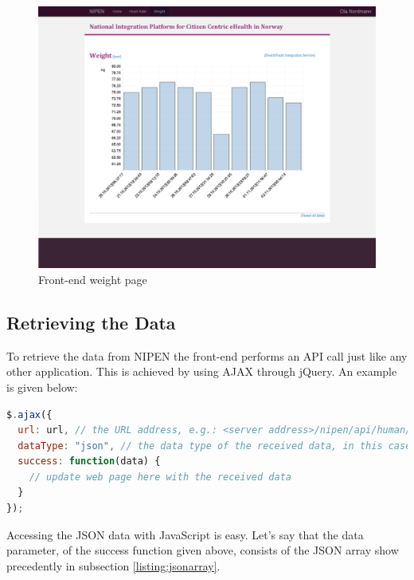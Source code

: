 \begin{figure}[H]
\centering
\includegraphics[scale=0.4]{../Figures/frontend-weight-page.png}
\caption{Front-end weight page}
\label{figure:frontend-weight-page}
\end{figure}

\subsection{Retrieving the Data}

To retrieve the data from NIPEN the front-end performs an API call just like any other application.
This is achieved by using AJAX through jQuery. An example is given below:
\begin{lstlisting}[language=JavaScript]
$.ajax({
  url: url, // the URL address, e.g.: <server address>/nipen/api/human/weights
  dataType: "json", // the data type of the received data, in this case a JSON string
  success: function(data) {
	// update web page here with the received data
  }
});
\end{lstlisting}

Accessing the JSON data with JavaScript is easy.
Let's say that the data parameter, of the success function given above, consists of the JSON array show precedently 
in subsection \ref{listing:jsonarray}.

